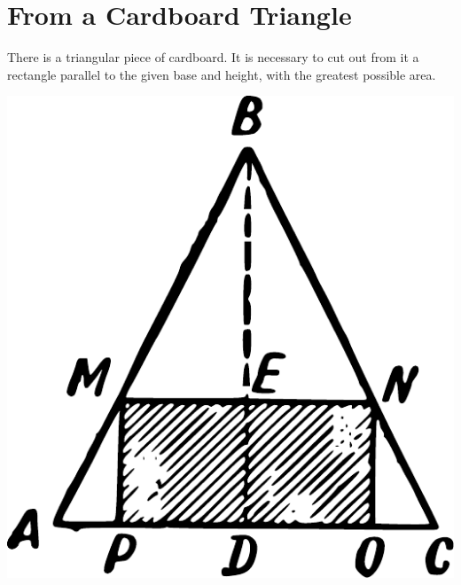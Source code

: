 \section{From a Cardboard Triangle} 
\label{sec-12.12}


\ques There is a triangular piece of cardboard. It is necessary to cut out from it a rectangle parallel to the given base and height, with the greatest possible area.

\begin{marginfigure}%
\centering
\includegraphics[width=\textwidth]{figures/ch-12/fig-182.pdf}
\end{marginfigure}



